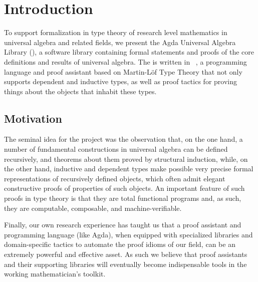 \section{Introduction}\label{sec:introduction}
To support formalization in type theory of research level mathematics in universal algebra and related fields, we present the Agda Universal Algebra Library (\agdaualib), a software library containing formal statements and proofs of the core definitions and results of universal algebra. 
The \ualib is written in \agda~\cite{Norell:2009}, a programming language and proof assistant based on Martin-L\"of Type Theory that not only supports dependent and inductive types, as well as proof tactics for proving things about the objects that inhabit these types.

\subsection{Motivation}\label{sec:motivation}
The seminal idea for the \agdaualib project was the observation that, on the one hand, a number of fundamental constructions in universal algebra can be defined recursively, and theorems about them proved by structural induction, while, on the other hand, inductive and dependent types make possible very precise formal representations of recursively defined objects, which often admit elegant constructive proofs of properties of such objects.  An important feature of such proofs in type theory is that they are total functional programs and, as such, they are computable, composable, and machine-verifiable.

Finally, our own research experience has taught us that a proof assistant and programming language (like Agda), when equipped with specialized libraries and domain-specific tactics to automate the proof idioms of our field, can be an extremely powerful and effective asset. As such we believe that proof assistants and their supporting libraries will eventually become indispensable tools in the working mathematician's toolkit.


